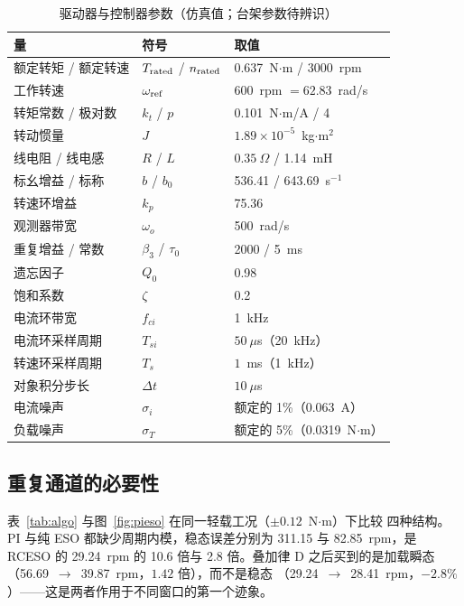\documentclass[journal]{IEEEtran}
\theoremstyle{remark}
\begin{document}
\begin{table}[!t]
\centering
\caption{驱动器与控制器参数（仿真值；台架参数待辨识）}
\label{tab:param}
\footnotesize
\setlength{\tabcolsep}{3pt}
\begin{tabular}{@{}lll@{}}
\toprule
量 & 符号 & 取值\\
\midrule
额定转矩 / 额定转速 & $T_{\rm rated}$ / $n_{\rm rated}$ & 0.637~N$\cdot$m / 3000~rpm\\
工作转速 & $\omega_{\rm ref}$ & 600~rpm $=62.83$~rad/s\\
转矩常数 / 极对数 & $k_t$ / $p$ & 0.101~N$\cdot$m/A / 4\\
转动惯量 & $J$ & $1.89\times10^{-5}$~kg$\cdot$m$^2$\\
线电阻 / 线电感 & $R$ / $L$ & $0.35~\Omega$ / 1.14~mH\\
标幺增益 / 标称 & $b$ / $b_0$ & 536.41 / 643.69~s$^{-1}$\\
转速环增益 & $k_p$ & 75.36\\
观测器带宽 & $\omega_o$ & 500~rad/s\\
重复增益 / 常数 & $\beta_3$ / $\tau_0$ & 2000 / 5~ms\\
遗忘因子 & $Q_0$ & 0.98\\
饱和系数 & $\zeta$ & 0.2\\
电流环带宽 & $f_{ci}$ & 1~kHz\\
电流环采样周期 & $T_{si}$ & $50~\mu$s（20~kHz）\\
转速环采样周期 & $T_s$ & $1$~ms（1~kHz）\\
对象积分步长 & $\Delta t$ & $10~\mu$s\\
电流噪声 & $\sigma_i$ & 额定的 1\%（0.063~A）\\
负载噪声 & $\sigma_T$ & 额定的 5\%（0.0319~N$\cdot$m）\\
\bottomrule
\end{tabular}
\end{table}

\subsection{重复通道的必要性}
表~\ref{tab:algo} 与图~\ref{fig:pieso} 在同一轻载工况（$\pm0.12$~N$\cdot$m）下比较
四种结构。PI 与纯 ESO 都缺少周期内模，稳态误差分别为 311.15 与 82.85~rpm，是 RCESO
的 29.24~rpm 的 10.6 倍与 2.8 倍。叠加律 D 之后买到的是加载瞬态
（56.69~$\to$~39.87~rpm，$1.42$ 倍），而不是稳态
（29.24~$\to$~28.41~rpm，$-2.8\%$）——这是两者作用于不同窗口的第一个迹象。
\end{document}
